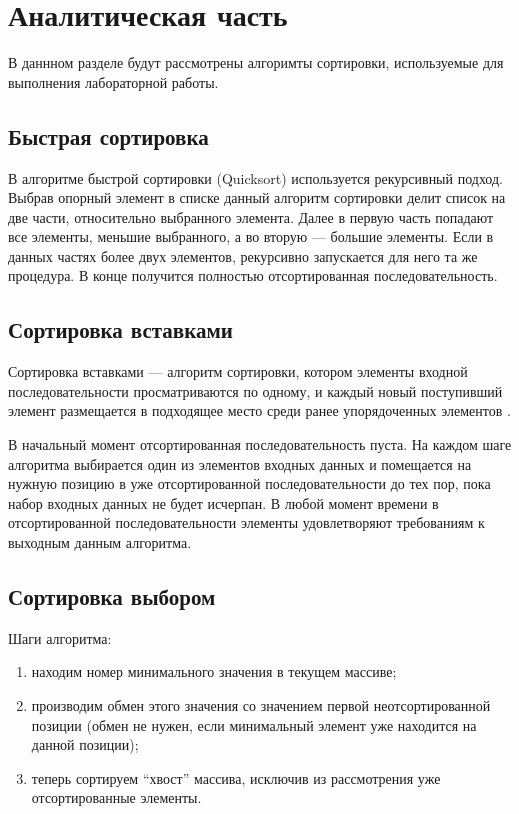 \chapter{Аналитическая часть}

В даннном разделе будут рассмотрены алгоримты сортировки, используемые для выполнения лабораторной работы.

\section{Быстрая сортировка}

В алгоритме быстрой сортировки (Quicksort) используется рекурсивный подход.
Выбрав опорный элемент в списке данный алгоритм сортировки делит список на две части, относительно выбранного элемента.
Далее в первую часть попадают все элементы, меньшие выбранного, а во вторую — большие элементы. 
Если в данных частях более двух элементов, рекурсивно запускается для него та же процедура. 
В конце получится полностью отсортированная последовательность.

\section{Сортировка вставками}

Сортировка вставками — алгоритм сортировки, котором элементы входной последовательности просматриваются по одному, и каждый новый поступивший элемент размещается в подходящее место среди ранее упорядоченных элементов \cite{Knut}.

В начальный момент отсортированная последовательность пуста.
На каждом шаге алгоритма выбирается один из элементов входных данных и помещается на нужную позицию в уже отсортированной последовательности до тех пор, пока набор входных данных не будет исчерпан.
В любой момент времени в отсортированной последовательности элементы удовлетворяют требованиям к выходным данным алгоритма.

\section{Сортировка выбором}

Шаги алгоритма:
\begin{enumerate}
	\item находим номер минимального значения в текущем массиве;
	\item производим обмен этого значения со значением первой неотсортированной позиции (обмен не нужен, если минимальный элемент уже находится на данной позиции);
	\item теперь сортируем ``хвост'' массива, исключив из рассмотрения уже отсортированные элементы.
\end{enumerate}

